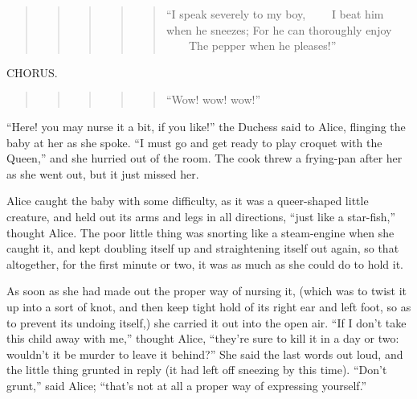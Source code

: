 \documentclass[11pt,openany,oneside]{book}
\begin{document}
\begin{quote}
\begin{quote}
\begin{quote}
\begin{quote}
\begin{quote}
{\small “I speak severely to my boy,}\newline
{\small  ~~~~I beat him when he sneezes;}\newline
{\small  For he can thoroughly enjoy}\newline
{\small  ~~~~The pepper when he pleases!” }

\end{quote}
\end{quote}
\end{quote}
\end{quote}
\end{quote}
{\centering CHORUS. 

}
\begin{quote}
\begin{quote}
\begin{quote}
\begin{quote}
\begin{quote}
{\small “Wow! wow! wow!” }

\end{quote}
\end{quote}
\end{quote}
\end{quote}
\end{quote}
“Here! you may nurse it a bit, if you like!” the Duchess said to Alice, flinging the baby at her as she spoke. “I must go and get ready to play croquet with the Queen,” and she hurried out of the room. The cook threw a frying-pan after her as she went out, but it just missed her. 

Alice caught the baby with some difficulty, as it was a queer-shaped little creature, and held out its arms and legs in all directions, “just like a star-fish,” thought Alice. The poor little thing was snorting like a steam-engine when she caught it, and kept doubling itself up and straightening itself out again, so that altogether, for the first minute or two, it was as much as she could do to hold it. 

As soon as she had made out the proper way of nursing it, (which was to twist it up into a sort of knot, and then keep tight hold of its right ear and left foot, so as to prevent its undoing itself,) she carried it out into the open air. “If I don’t take this child away with me,” thought Alice, “they’re sure to kill it in a day or two: wouldn’t it be murder to leave it behind?” She said the last words out loud, and the little thing grunted in reply (it had left off sneezing by this time). “Don’t grunt,” said Alice; “that’s not at all a proper way of expressing yourself.” 
\end{document}
